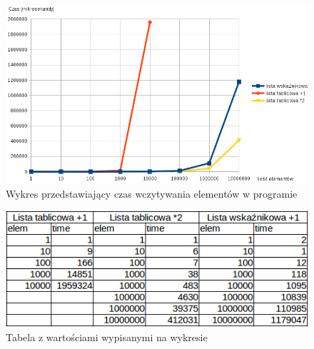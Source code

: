 \documentclass[a4paper,10pt]{scrartcl}
\begin{document}
\begin{landscape}
\begin{figure}
 \centering
  \includegraphics[scale=0.9]{wykres1}
 \caption{Wykres przedstawiający czas wczytywania elementów w programie}
\end{figure}

\pagebreak

\begin{figure}
 \centering
  \includegraphics[scale=1]{tabela}
 \caption{Tabela z wartościami wypisanymi na wykresie}
\end{figure}
\end{landscape}
\end{document}
